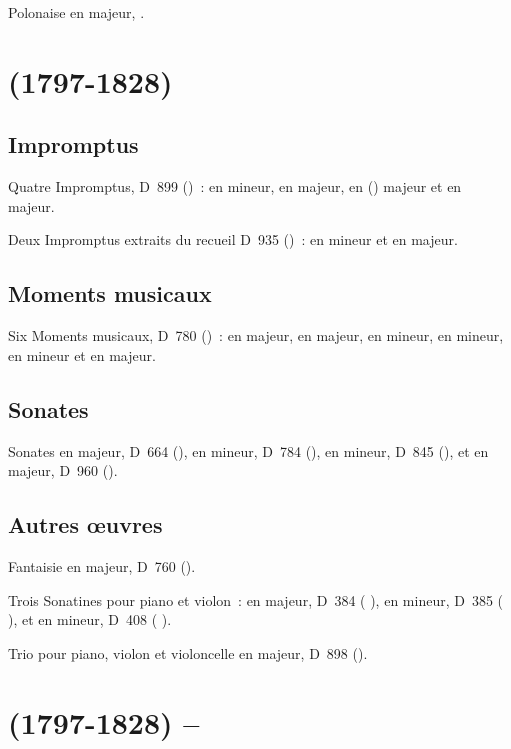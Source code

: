 Polonaise en \kC majeur, .

\section[%
Franz Schubert (1797-1828)]{%
\FSchubert{} (1797-1828)}

\subsection{Impromptus}

Quatre Impromptus, D~899 ()~:  en \kC mineur, 
en \kE \Flat majeur,  en \kG (\Flat) majeur et  en \kA
\Flat majeur.

Deux Impromptus extraits du recueil D~935 ()~:  en \kF
mineur et  en \kA \Flat majeur.

\subsection{Moments musicaux}

Six Moments musicaux, D~780 ()~:  en \kC majeur,
 en \kA \Flat majeur,  en \kF mineur,  en \kC
\Sharp mineur,  en \kF mineur et  en \kA \Flat majeur.

\subsection{Sonates}

Sonates en \kA majeur, D~664 (), en \kA mineur, D~784
(), en \kA mineur, D~845 (), et en \kB \Flat majeur,
D~960 ().

\subsection{Autres œuvres}

Fantaisie  en \kC majeur, D~760 ().

Trois Sonatines pour piano et violon~: en \kD majeur, D~384 (
), en \kA mineur, D~385 ( ), et en \kG mineur,
D~408 ( ).

Trio  pour piano, violon et violoncelle en \kB \Flat majeur, D~898
().

\section[%
Franz Schubert (1797-1828) -- Ferenc Liszt]{%
\FSchubert{} (1797-1828) -- \FLiszt{}}

